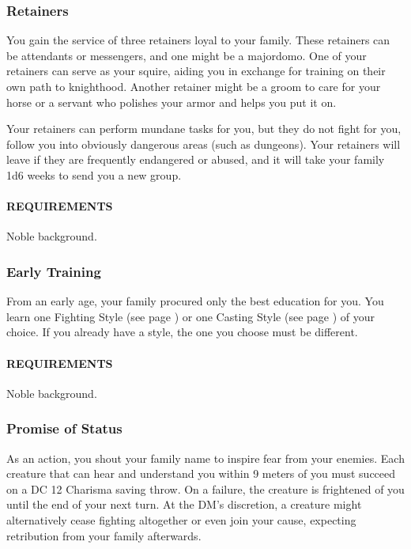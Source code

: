     \subsubsection{Retainers} \label{feat::retainers}
        You gain the service of three retainers loyal to your family.
        These retainers can be attendants or messengers, and one might be a majordomo.
        One of your retainers can serve as your squire, aiding you in exchange for training on their own path to knighthood.
        Another retainer might be a groom to care for your horse or a servant who polishes your armor and helps you put it on.

        Your retainers can perform mundane tasks for you, but they do not fight for you, follow you into obviously dangerous areas (such as dungeons).
        Your retainers will leave if they are frequently endangered or abused, and it will take your family 1d6 weeks to send you a new group.
        \paragraph{REQUIREMENTS} Noble background.

    \subsubsection{Early Training} \label{feat::earlytraining}
        From an early age, your family procured only the best education for you.
        You learn one Fighting Style (see page \pageref{ssec::fightingstyles}) or one Casting Style (see page \pageref{ssec::castingstyle}) of your choice.
        If you already have a style, the one you choose must be different.
        \paragraph{REQUIREMENTS} Noble background.

    \subsubsection{Promise of Status} \label{feat::promiseofstatus}
        As an action, you shout your family name to inspire fear from your enemies.
        Each creature that can hear and understand you within 9 meters of you must succeed on a DC 12 Charisma saving throw.
        On a failure, the creature is frightened of you until the end of your next turn.
        At the DM's discretion, a creature might alternatively cease fighting altogether or even join your cause, expecting retribution from your family afterwards.

